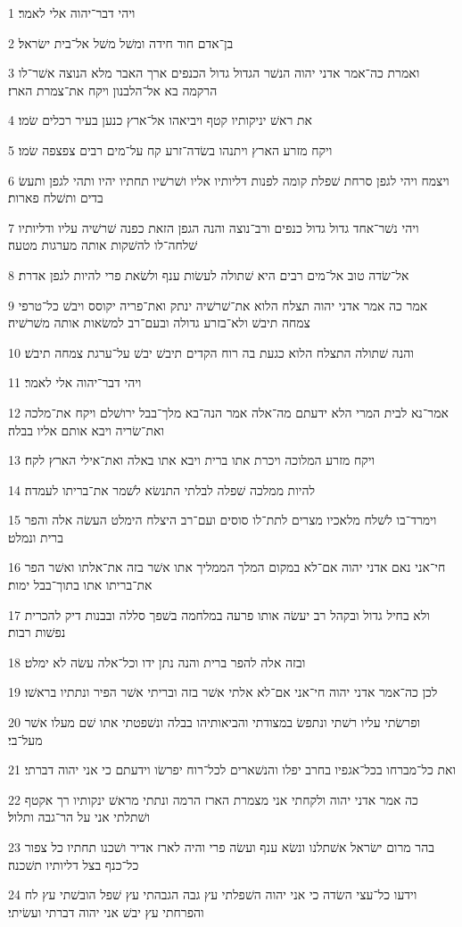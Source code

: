 \par 1 ויהי דבר־יהוה אלי לאמר׃
\par 2 בן־אדם חוד חידה ומשׁל משׁל אל־בית ישׂראל׃
\par 3 ואמרת כה־אמר אדני יהוה הנשׁר הגדול גדול הכנפים ארך האבר מלא הנוצה אשׁר־לו הרקמה בא אל־הלבנון ויקח את־צמרת הארז׃
\par 4 את ראשׁ יניקותיו קטף ויביאהו אל־ארץ כנען בעיר רכלים שׂמו׃
\par 5 ויקח מזרע הארץ ויתנהו בשׂדה־זרע קח על־מים רבים צפצפה שׂמו׃
\par 6 ויצמח ויהי לגפן סרחת שׁפלת קומה לפנות דליותיו אליו ושׁרשׁיו תחתיו יהיו ותהי לגפן ותעשׂ בדים ותשׁלח פארות׃
\par 7 ויהי נשׁר־אחד גדול גדול כנפים ורב־נוצה והנה הגפן הזאת כפנה שׁרשׁיה עליו ודליותיו שׁלחה־לו להשׁקות אותה מערגות מטעה׃
\par 8 אל־שׂדה טוב אל־מים רבים היא שׁתולה לעשׂות ענף ולשׂאת פרי להיות לגפן אדרת׃
\par 9 אמר כה אמר אדני יהוה תצלח הלוא את־שׁרשׁיה ינתק ואת־פריה יקוסס ויבשׁ כל־טרפי צמחה תיבשׁ ולא־בזרע גדולה ובעם־רב למשׂאות אותה משׁרשׁיה׃
\par 10 והנה שׁתולה התצלח הלוא כגעת בה רוח הקדים תיבשׁ יבשׁ על־ערגת צמחה תיבשׁ׃
\par 11 ויהי דבר־יהוה אלי לאמר׃
\par 12 אמר־נא לבית המרי הלא ידעתם מה־אלה אמר הנה־בא מלך־בבל ירושׁלם ויקח את־מלכה ואת־שׂריה ויבא אותם אליו בבלה׃
\par 13 ויקח מזרע המלוכה ויכרת אתו ברית ויבא אתו באלה ואת־אילי הארץ לקח׃
\par 14 להיות ממלכה שׁפלה לבלתי התנשׂא לשׁמר את־בריתו לעמדה׃
\par 15 וימרד־בו לשׁלח מלאכיו מצרים לתת־לו סוסים ועם־רב היצלח הימלט העשׂה אלה והפר ברית ונמלט׃
\par 16 חי־אני נאם אדני יהוה אם־לא במקום המלך הממליך אתו אשׁר בזה את־אלתו ואשׁר הפר את־בריתו אתו בתוך־בבל ימות׃
\par 17 ולא בחיל גדול ובקהל רב יעשׂה אותו פרעה במלחמה בשׁפך סללה ובבנות דיק להכרית נפשׁות רבות׃
\par 18 ובזה אלה להפר ברית והנה נתן ידו וכל־אלה עשׂה לא ימלט׃
\par 19 לכן כה־אמר אדני יהוה חי־אני אם־לא אלתי אשׁר בזה ובריתי אשׁר הפיר ונתתיו בראשׁו׃
\par 20 ופרשׂתי עליו רשׁתי ונתפשׂ במצודתי והביאותיהו בבלה ונשׁפטתי אתו שׁם מעלו אשׁר מעל־בי׃
\par 21 ואת כל־מברחו בכל־אגפיו בחרב יפלו והנשׁארים לכל־רוח יפרשׂו וידעתם כי אני יהוה דברתי׃
\par 22 כה אמר אדני יהוה ולקחתי אני מצמרת הארז הרמה ונתתי מראשׁ ינקותיו רך אקטף ושׁתלתי אני על הר־גבה ותלול׃
\par 23 בהר מרום ישׂראל אשׁתלנו ונשׂא ענף ועשׂה פרי והיה לארז אדיר ושׁכנו תחתיו כל צפור כל־כנף בצל דליותיו תשׁכנה׃
\par 24 וידעו כל־עצי השׂדה כי אני יהוה השׁפלתי עץ גבה הגבהתי עץ שׁפל הובשׁתי עץ לח והפרחתי עץ יבשׁ אני יהוה דברתי ועשׂיתי׃

